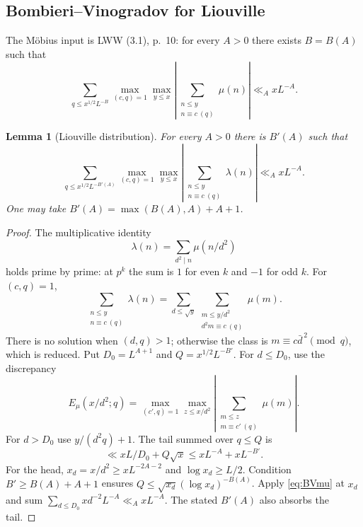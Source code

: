 \documentclass[11pt]{article}
\newtheorem{lemma}[theorem]{Lemma}
\theoremstyle{definition}
\theoremstyle{remark}
\numberwithin{equation}{section}
\begin{document}
\subsection{Bombieri--Vinogradov for Liouville}\label{subsec:lambda-BV}
The M\"obius input is LWW (3.1), p.~10: for every $A>0$ there
exists $B=B(A)$ such that
\begin{equation}\label{eq:BVmu}
 \sum_{q\le x^{1/2}L^{-B}}
 \max_{(c,q)=1}\max_{y\le x}
 \left|\sum_{\substack{n\le y\\n\equiv c\ (q)}}\mu(n)\right|
 \ll_A xL^{-A}.
\end{equation}
\begin{lemma}[Liouville distribution]\label{lem:BVlambda}
For every $A>0$ there is $B'(A)$ such that
\begin{equation}\label{eq:BVlambda}
 \sum_{q\le x^{1/2}L^{-B'(A)}}
 \max_{(c,q)=1}\max_{y\le x}
 \left|\sum_{\substack{n\le y\\n\equiv c\ (q)}}\lambda(n)\right|
 \ll_A xL^{-A}.
\end{equation}
One may take $B'(A)=\max(B(A),A)+A+1$.
\end{lemma}
\begin{proof}
The multiplicative identity
\begin{equation}\label{eq:lambda-mu-convolution}
 \lambda(n)=\sum_{d^2\mid n}\mu(n/d^2)
\end{equation}
holds prime by prime: at $p^k$ the sum is $1$ for even $k$ and
$-1$ for odd $k$.
For $(c,q)=1$,
\[
 \sum_{\substack{n\le y\\n\equiv c\ (q)}}\lambda(n)
 =\sum_{d\le\sqrt y}\sum_{\substack{m\le y/d^2\\d^2m\equiv c\ (q)}}\mu(m).
\]
There is no solution when $(d,q)>1$; otherwise the class is
$m\equiv c\bar d^{\,2}\pmod q$, which is reduced.
Put $D_0=L^{A+1}$ and $Q=x^{1/2}L^{-B'}$.
For $d\le D_0$, use the discrepancy
\[
 E_\mu(x/d^2;q)=\max_{(c',q)=1}\max_{z\le x/d^2}
 \left|\sum_{\substack{m\le z\\m\equiv c'\ (q)}}\mu(m)\right|.
\]
For $d>D_0$ use $y/(d^2q)+1$.
The tail summed over $q\le Q$ is
\begin{equation}\label{eq:lambda-BV-tail}
 \ll xL/D_0+Q\sqrt x\le xL^{-A}+xL^{-B'}.
\end{equation}
For the head, $x_d=x/d^2\ge xL^{-2A-2}$ and
$\log x_d\ge L/2$. Condition $B'\ge B(A)+A+1$ ensures
$Q\le\sqrt{x_d}(\log x_d)^{-B(A)}$.
Apply \eqref{eq:BVmu} at $x_d$ and sum
$\sum_{d\le D_0}xd^{-2}L^{-A}\ll_A xL^{-A}$.
The stated $B'(A)$ also absorbs the tail.
\end{proof}
\end{document}
